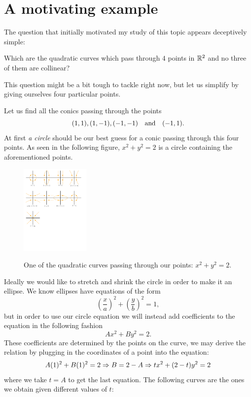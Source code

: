 \documentclass[12pt]{memoir}
\begin{document}
\section{A motivating example}

The question that initially motivated my study of this topic appears deceptively simple:

\begin{significant}
        Which are the quadratic curves which pass through $4$ points in $\mathbb{R}^2$ and no three of them are collinear?
\end{significant}
    This question might be a bit tough to tackle right now, but let us simplify by giving ourselves four particular points.
    
\begin{Ex}
    Let us find all the conics passing through the points 
    $$(1,1),(1,-1),(-1,-1)\quad\text{and}\quad(-1,1).$$At first \emph{a circle} should be our best guess for a conic passing through this four points. As seen in the following figure, $x^2+y^2=2$ is a circle containing the aforementioned points.
    \begin{figure}[h!]
        \centering
        \includegraphics[width=0.3\textwidth, trim= 0.8cm 22.9cm 16cm 0.6cm,clip]{Figs/fig1Intro.pdf}
        \label{fig1Intro}
        \caption{One of the quadratic curves passing through our points: $x^2+y^2=2$.}
    \end{figure}\newpage
    Ideally we would like to stretch and shrink the circle in order to make it an ellipse. We know ellipses have equations of the form 
    $$\left(\frac xa\right)^2+\left(\frac yb\right)^2=1,$$ 
    but in order to use our circle equation we will instead add coefficients to the equation in the following fashion
    $$Ax^2+By^2=2.$$
    These coefficients are determined by the points on the curve, we may derive the relation by plugging in the coordinates of a point into the equation:
    $$A(1)^2+B(1)^2=2\Rightarrow B=2-A\Rightarrow tx^2+(2-t)y^2=2$$
    where we take $t=A$ to get the last equation.
    The following curves are the ones we obtain given different values of $t$:

\end{Ex}
\end{document}
